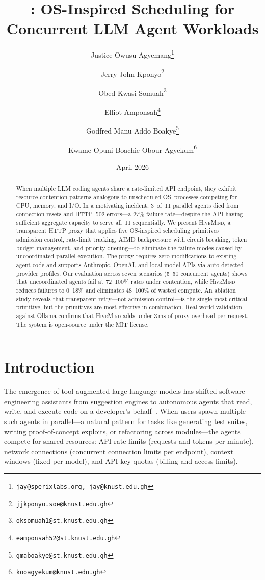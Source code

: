 \documentclass[11pt,twocolumn]{article}
\title{\hm{}: OS-Inspired Scheduling for\\Concurrent LLM Agent Workloads}
\author[1,2,3]{Justice Owusu Agyemang\thanks{\texttt{jay@sperixlabs.org, jay@knust.edu.gh}}}
\author[3]{Jerry John Kponyo\thanks{\texttt{jjkponyo.soe@knust.edu.gh}}}
\author[2]{Obed Kwasi Somuah\thanks{\texttt{oksomuah1@st.knust.edu.gh}}}
\author[3]{Elliot Amponsah\thanks{\texttt{eamponsah52@st.knust.edu.gh}}}
\author[3]{Godfred Manu Addo Boakye\thanks{\texttt{gmaboakye@st.knust.edu.gh}}}
\author[2]{Kwame Opuni-Boachie Obour Agyekum\thanks{\texttt{kooagyekum@knust.edu.gh}}}
\affil[1]{\small Sperix Labs}
\affil[2]{\small VIA Cybersecurity Lab, KNUST}
\affil[3]{\small Quantum and Assistive Technologies Lab, KNUST}
\date{April 2026}
\newcommand{\hm}{\textsc{HiveMind}}
\begin{document}
\maketitle

\begin{abstract}
When multiple LLM coding agents share a rate-limited API endpoint,
they exhibit resource contention patterns analogous to unscheduled
OS~processes competing for CPU, memory, and I/O\@.  In a motivating
incident, 3~of~11 parallel agents died from connection resets and
HTTP~502 errors---a 27\% failure rate---despite the API having
sufficient aggregate capacity to serve all~11 sequentially.
We present \hm{}, a transparent HTTP proxy that applies five
OS-inspired scheduling primitives---admission control, rate-limit
tracking, AIMD backpressure with circuit breaking, token budget
management, and priority queuing---to eliminate the failure modes
caused by uncoordinated parallel execution.  The proxy requires
zero modifications to existing agent code and supports Anthropic,
OpenAI, and local model APIs via auto-detected provider profiles.
Our evaluation across seven scenarios (5--50 concurrent agents)
shows that uncoordinated agents fail at 72--100\% rates under
contention, while \hm{} reduces failures to 0--18\% and eliminates
48--100\% of wasted compute.  An ablation study reveals that
transparent retry---not admission control---is the single most
critical primitive, but the primitives are most effective in
combination.  Real-world validation against Ollama confirms that
\hm{} adds under 3\,ms of proxy overhead per request.
The system is open-source under the MIT license.
\end{abstract}

\section{Introduction}
\label{sec:intro}

The emergence of tool-augmented large language models has shifted
software-engineering assistants from suggestion engines to autonomous
agents that read, write, and execute code on a developer's
behalf~\cite{claudecode2025,codex2025,cursor2024,copilot2024}.
When users spawn multiple such agents in parallel---a natural
pattern for tasks like generating test suites, writing
proof-of-concept exploits, or refactoring across modules---the
agents compete for shared resources: API rate limits (requests
and tokens per minute), network connections (concurrent connection
limits per endpoint), context windows (fixed per model), and
API-key quotas (billing and access limits).
\end{document}
